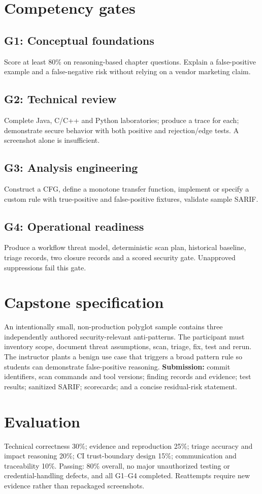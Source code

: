 \documentclass[10pt,letterpaper]{article}
\begin{document}
\section{Competency gates}
\subsection{G1: Conceptual foundations}
Score at least 80\% on reasoning-based chapter questions. Explain a false-positive example and a false-negative risk without relying on a vendor marketing claim.
\subsection{G2: Technical review}
Complete Java, C/C++ and Python laboratories; produce a trace for each; demonstrate secure behavior with both positive and rejection/edge tests. A screenshot alone is insufficient.
\subsection{G3: Analysis engineering}
Construct a CFG, define a monotone transfer function, implement or specify a custom rule with true-positive and false-positive fixtures, validate sample SARIF.
\subsection{G4: Operational readiness}
Produce a workflow threat model, deterministic scan plan, historical baseline, triage records, two closure records and a scored security gate. Unapproved suppressions fail this gate.
\section{Capstone specification}
An intentionally small, non-production polyglot sample contains three independently authored security-relevant anti-patterns. The participant must inventory scope, document threat assumptions, scan, triage, fix, test and rerun. The instructor plants a benign use case that triggers a broad pattern rule so students can demonstrate false-positive reasoning. \textbf{Submission:} commit identifiers, scan commands and tool versions; finding records and evidence; test results; sanitized SARIF; scorecards; and a concise residual-risk statement.
\section{Evaluation}
Technical correctness 30\%; evidence and reproduction 25\%; triage accuracy and impact reasoning 20\%; CI trust-boundary design 15\%; communication and traceability 10\%. Passing: 80\% overall, no major unauthorized testing or credential-handling defects, and all G1--G4 completed. Reattempts require new evidence rather than repackaged screenshots.
\end{document}
